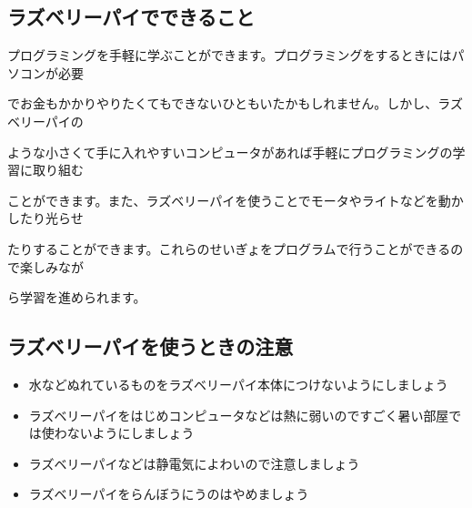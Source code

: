 \documentclass[a4paper,12pt]{jarticle}
\begin{document}
\subsection{ラズベリーパイでできること}
プログラミングを手軽に学ぶことができます。プログラミングをするときにはパソコンが必要

でお金もかかりやりたくてもできないひともいたかもしれません。しかし、ラズベリーパイの

ような小さくて手に入れやすいコンピュータがあれば手軽にプログラミングの学習に取り組む

ことができます。また、ラズベリーパイを使うことでモータやライトなどを動かしたり光らせ

たりすることができます。これらのせいぎょをプログラムで行うことができるので楽しみなが

ら学習を進められます。

\subsection{ラズベリーパイを使うときの注意}
\begin{itemize}
  \item
        水などぬれているものをラズベリーパイ本体につけないようにしましょう
\end{itemize}
\begin{itemize}
  \item
        ラズベリーパイをはじめコンピュータなどは熱に弱いのですごく暑い部屋では使わないようにしましょう
\end{itemize}
\begin{itemize}
  \item
        ラズベリーパイなどは静電気によわいので注意しましょう
\end{itemize}
\begin{itemize}
  \item
        ラズベリーパイをらんぼうにうのはやめましょう
\end{itemize}


\clearpage
\end{document}
